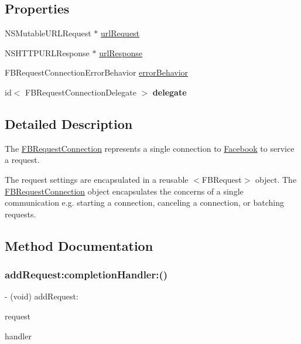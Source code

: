 \subsection*{Properties}
\begin{DoxyCompactItemize}
\item 
N\+S\+Mutable\+U\+R\+L\+Request $\ast$ \hyperlink{interfaceFBRequestConnection_a41efe8c55044a56156d5dbd08a0fa2be}{url\+Request}
\item 
N\+S\+H\+T\+T\+P\+U\+R\+L\+Response $\ast$ \hyperlink{interfaceFBRequestConnection_a7d85948b4a9b9cad6675587e36307bb3}{url\+Response}
\item 
F\+B\+Request\+Connection\+Error\+Behavior \hyperlink{interfaceFBRequestConnection_aa8870f7bb472f27e6453cc92c2e1a352}{error\+Behavior}
\item 
\mbox{\label{interfaceFBRequestConnection_a15ba03cef9c8aaefe44594d72f8204b9}} 
id$<$ F\+B\+Request\+Connection\+Delegate $>$ {\bfseries delegate}
\end{DoxyCompactItemize}


\subsection{Detailed Description}
The {\ttfamily \hyperlink{interfaceFBRequestConnection}{F\+B\+Request\+Connection}} represents a single connection to \hyperlink{interfaceFacebook}{Facebook} to service a request.

The request settings are encapsulated in a reusable $<$\+F\+B\+Request$>$ object. The {\ttfamily \hyperlink{interfaceFBRequestConnection}{F\+B\+Request\+Connection}} object encapsulates the concerns of a single communication e.\+g. starting a connection, canceling a connection, or batching requests. 

\subsection{Method Documentation}
\mbox{\label{interfaceFBRequestConnection_a751b0603d2cc22be745f33a112681e0d}} 
\subsubsection{\texorpdfstring{add\+Request\+:completion\+Handler\+:()}{addRequest:completionHandler:()}\hspace{0.1cm}{\footnotesize\ttfamily [1/5]}}
{\footnotesize\ttfamily -\/ (void) add\+Request\+: \begin{DoxyParamCaption}\item[{(\hyperlink{interfaceFBRequest}{F\+B\+Request} $\ast$)}]{request }\item[{completionHandler:(F\+B\+Request\+Handler)}]{handler }\end{DoxyParamCaption}}

